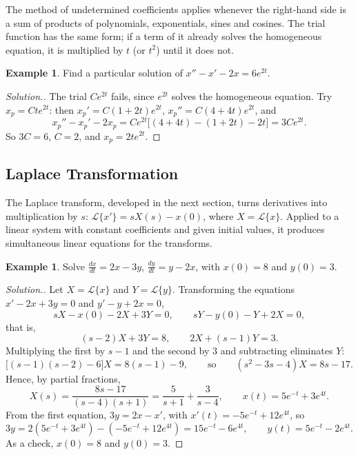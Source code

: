 \documentclass[11pt,a4paper]{article}
\theoremstyle{definition}
\newtheorem{exa}[thm]{Example}
\newenvironment{solution}
  {\renewcommand{\qedsymbol}{}\begin{proof}[\textit{Solution}.]}
  {\end{proof}}
\begin{document}
The method of undetermined coefficients applies whenever the right-hand side is
a sum of products of polynomials, exponentials, sines and cosines. The trial
function has the same form; if a term of it already solves the homogeneous
equation, it is multiplied by $t$ (or $t^2$) until it does not.

\begin{exa}
\label{ex:undeterminedres}
Find a particular solution of $x'' - x' - 2x = 6e^{2t}$.
\end{exa}

\begin{solution}
The trial $Ce^{2t}$ fails, since $e^{2t}$ solves the homogeneous equation. Try
$x_p = Cte^{2t}$: then $x_p' = C(1 + 2t)e^{2t}$, $x_p'' = C(4 + 4t)e^{2t}$, and
\[x_p'' - x_p' - 2x_p = Ce^{2t}\big[(4 + 4t) - (1 + 2t) - 2t\big] = 3Ce^{2t} .\]
So $3C = 6$, $C = 2$, and $x_p = 2te^{2t}$.
\end{solution}

{\color[wave]{485}\subsection{Laplace Transformation}}

The Laplace transform, developed in the next section, turns derivatives into
multiplication by $s$: $\mathcal L\{x'\} = sX(s) - x(0)$, where
$X = \mathcal L\{x\}$. Applied to a linear system with constant coefficients and
given initial values, it produces simultaneous linear equations for the
transforms.

\begin{exa}
\label{ex:laplacesystem}
Solve $\frac{dx}{dt} = 2x - 3y$, $\frac{dy}{dt}= y - 2x$, with $x(0) = 8$ and
$y(0) = 3$.
\end{exa}

\begin{solution}
Let $X = \mathcal{L}\{x\}$ and $Y = \mathcal{L}\{y\}$. Transforming the equations
$x' - 2x + 3y = 0$ and $y' - y + 2x = 0$,
\[sX - x(0) - 2X + 3Y = 0 ,\qquad sY - y(0) - Y + 2X = 0 ,\]
that is,
\[(s-2)X + 3Y = 8 ,\qquad 2X + (s-1)Y = 3 .\]
Multiplying the first by $s - 1$ and the second by $3$ and subtracting
eliminates $Y$:
\[\big[(s-1)(s-2) - 6\big] X = 8(s-1) - 9,\qquad\text{so}\qquad (s^2 - 3s -4)X =
8s - 17 .\]
Hence, by partial fractions,
\[X(s) = \frac{8s - 17}{(s-4)(s+1)} = \frac{5}{s + 1} + \frac{3}{s - 4},\qquad
x(t) = 5e^{-t} + 3e^{4t} .\]
From the first equation, $3y = 2x - x'$, with $x'(t) = -5e^{-t} + 12 e^{4t}$, so
\[3y = 2 ( 5e^{-t} + 3e^{4t}) - (-5e^{-t} + 12e^{4t}) = 15e^{-t} - 6e^{4t} ,\qquad
y(t) = 5e^{-t} - 2e^{4t} .\]
As a check, $x(0) = 8$ and $y(0) = 3$.
\end{solution}
\end{document}
